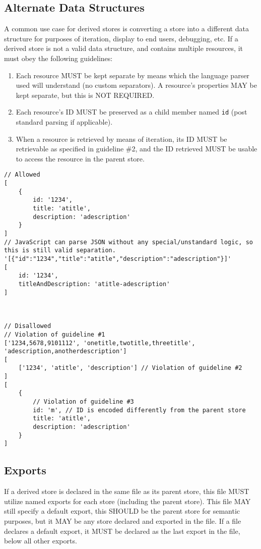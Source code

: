 \documentclass{article}
\begin{document}
\subsection{Alternate Data Structures}
A common use case for derived stores is converting a store into a different data structure for purposes of iteration, display to end users, debugging, etc. If a derived store is not a valid data structure, and contains multiple resources, it must obey the following guidelines:
\begin{enumerate}
    \item Each resource MUST be kept separate by means which the language parser used will understand (no custom separators). A resource's properties MAY be kept separate, but this is NOT REQUIRED.
    \item Each resource's ID MUST be preserved as a child member named \verb|id| (post standard parsing if applicable).
    \item When a resource is retrieved by means of iteration, its ID MUST be retrievable as specified in guideline \#2, and the ID retrieved MUST be usable to access the resource in the parent store.
\end{enumerate}

\begin{lstlisting}[caption=Derived Store as Array]
// Allowed
[
    {
        id: '1234',
        title: 'atitle',
        description: 'adescription'
    }
]
// JavaScript can parse JSON without any special/unstandard logic, so this is still valid separation.
'[{"id":"1234","title":"atitle","description":"adescription"}]'
[
    id: '1234',
    titleAndDescription: 'atitle-adescription'
]



// Disallowed
// Violation of guideline #1
['1234,5678,9101112', 'onetitle,twotitle,threetitle', 'adescription,anotherdescription']
[
    ['1234', 'atitle', 'description'] // Violation of guideline #2
]
[
    {
        // Violation of guideline #3
        id: 'm', // ID is encoded differently from the parent store
        title: 'atitle',
        description: 'adescription'
    }
]
\end{lstlisting}

\subsection{Exports}
If a derived store is declared in the same file as its parent store, this file MUST utilize named exports for each store (including the parent store). This file MAY still specify a default export, this SHOULD be the parent store for semantic purposes, but it MAY be any store declared and exported in the file. If a file declares a default export, it MUST be declared as the last export in the file, below all other exports.
\end{document}
